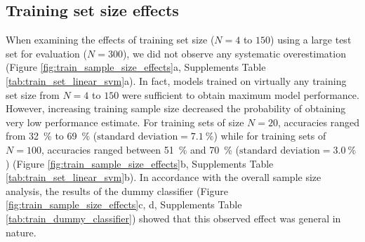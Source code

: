 \documentclass{article}
\begin{document}
    \subsection{Training set size effects}
    When examining the effects of training set size ($N=4$ to $150$) using a large test set for evaluation ($N=300$), we did not observe any systematic overestimation (Figure \ref{fig:train_sample_size_effects}a, Supplements Table \ref{tab:train_set_linear_svm}a). In fact, models trained on virtually any training set size from $N=4$ to $150$ were sufficient to obtain maximum model performance. However, increasing training sample size decreased the probability of obtaining very low performance estimate. For training sets of size $N=20$, accuracies ranged from \SI{32}{\percent} to \SI{69}{\percent} ($\text{standard deviation}=\SI{7.1}{\percent}$) while for training sets of $N=100$, accuracies ranged between \SI{51}{\percent} and \SI{70}{\percent} ($\text{standard deviation}=\SI{3.0}{\percent}$) (Figure \ref{fig:train_sample_size_effects}b, Supplements Table \ref{tab:train_set_linear_svm}b). In accordance with the overall sample size analysis, the results of the dummy classifier (Figure \ref{fig:train_sample_size_effects}c, d, Supplements Table \ref{tab:train_dummy_classifier}) showed that this observed effect was general in nature.
\end{document}
